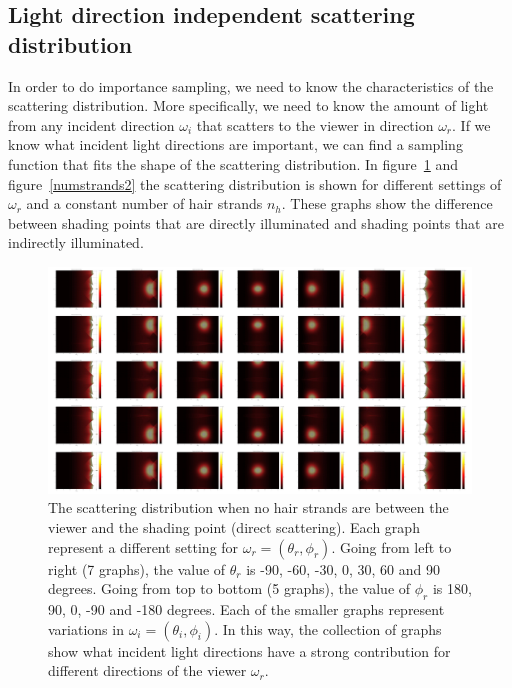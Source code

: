 \documentclass[11pt,a4paper]{report}
\begin{document}
\subsection{Light direction independent scattering distribution}

In order to do importance sampling, we need to know the characteristics of the scattering distribution. More specifically, we need to know the amount of light from any incident direction $\omega_i$ that scatters to the viewer in direction $\omega_r$. If we know what incident light directions are important, we can find a sampling function that fits the shape of the scattering distribution. In figure~\ref{numstrands0} and figure~\ref{numstrands2} the scattering distribution is shown for different settings of $\omega_r$ and a constant number of hair strands $n_h$. These graphs show the difference between shading points that are directly illuminated and shading points that are indirectly illuminated.

\begin{figure}[h]
\begin{center}
\includegraphics[scale=0.04]{images/scatteringdistribution/numstrands0.jpg}
\caption{The scattering distribution when no hair strands are between the viewer and the shading point (direct scattering). Each graph represent a different setting for $\omega_r = (\theta_r, \phi_r)$. Going from left to right (7 graphs), the value of $\theta_r$ is -90, -60, -30, 0, 30, 60 and 90 degrees. Going from top to bottom (5 graphs), the value of $\phi_r$ is 180, 90, 0, -90 and -180 degrees. Each of the smaller graphs represent variations in $\omega_i = (\theta_i, \phi_i)$. In this way, the collection of graphs show what incident light directions have a strong contribution for different directions of the viewer $\omega_r$.}
\label{numstrands0}

\end{center}
\end{figure}
\end{document}

